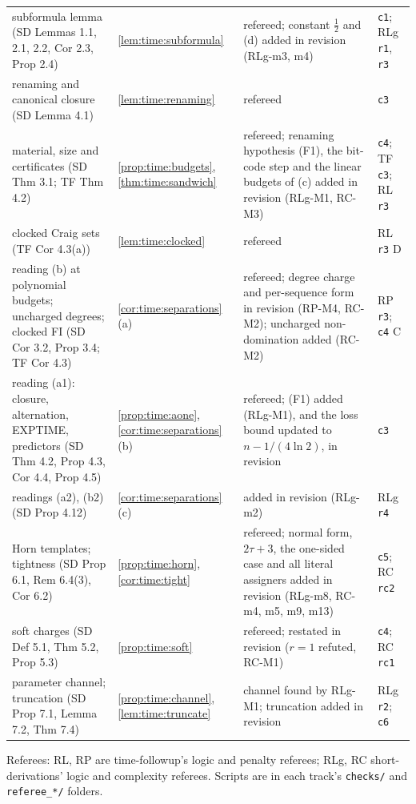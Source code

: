 {\begin{longtable}{@{}>{\raggedright\arraybackslash}p{3.6cm}>{\raggedright\arraybackslash}p{2.6cm}>{\raggedright\arraybackslash}p{6.0cm}>{\raggedright\arraybackslash}p{2.6cm}@{}}
subformula lemma (SD Lemmas 1.1, 2.1, 2.2, Cor 2.3, Prop 2.4) & \cref{lem:time:subformula} & refereed; constant $\frac12$ and (d) added in revision (RLg-m3, m4) & \texttt{c1}; RLg \texttt{r1}, \texttt{r3}\\
renaming and canonical closure (SD Lemma 4.1) & \cref{lem:time:renaming} & refereed & \texttt{c3}\\
material, size and certificates (SD Thm 3.1; TF Thm 4.2) & \cref{prop:time:budgets}, \cref{thm:time:sandwich} & refereed; renaming hypothesis (F1), the bit-code step and the linear budgets of (c) added in revision (RLg-M1, RC-M3) & \texttt{c4}; TF \texttt{c3}; RL \texttt{r3}\\
clocked Craig sets (TF Cor 4.3(a)) & \cref{lem:time:clocked} & refereed & RL \texttt{r3} D\\
reading (b) at polynomial budgets; uncharged degrees; clocked FI (SD Cor 3.2, Prop 3.4; TF Cor 4.3) & \cref{cor:time:separations}(a) & refereed; degree charge and per-sequence form in revision (RP-M4, RC-M2); uncharged non-domination added (RC-M2) & RP \texttt{r3}; \texttt{c4} C\\
reading (a1): closure, alternation, EXPTIME, predictors (SD Thm 4.2, Prop 4.3, Cor 4.4, Prop 4.5) & \cref{prop:time:aone}, \cref{cor:time:separations}(b) & refereed; (F1) added (RLg-M1), and the loss bound updated to $n-1/(4\ln2)$, in revision & \texttt{c3}\\
readings (a2), (b2) (SD Prop 4.12) & \cref{cor:time:separations}(c) & added in revision (RLg-m2) & RLg \texttt{r4}\\
Horn templates; tightness (SD Prop 6.1, Rem 6.4(3), Cor 6.2) & \cref{prop:time:horn}, \cref{cor:time:tight} & refereed; normal form, $2\tau+3$, the one-sided case and all literal assigners added in revision (RLg-m8, RC-m4, m5, m9, m13) & \texttt{c5}; RC \texttt{rc2}\\
soft charges (SD Def 5.1, Thm 5.2, Prop 5.3) & \cref{prop:time:soft} & refereed; restated in revision ($r=1$ refuted, RC-M1) & \texttt{c4}; RC \texttt{rc1}\\
parameter channel; truncation (SD Prop 7.1, Lemma 7.2, Thm 7.4) & \cref{prop:time:channel}, \cref{lem:time:truncate} & channel found by RLg-M1; truncation added in revision & RLg \texttt{r2}; \texttt{c6}\\
\end{longtable}
}

\noindent Referees: RL, RP are time-followup's logic and penalty referees; RLg, RC short-derivations' logic and complexity referees. Scripts are in each track's \texttt{checks/} and \texttt{referee\_*/} folders.

